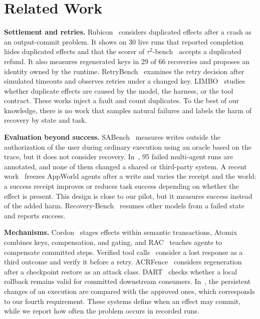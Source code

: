 \documentclass[conference]{IEEEtran}
\begin{document}
\section{Related Work}\label{sec:related}

\textbf{Settlement and retries.} Rubicon~\cite{mohammadi2026rubicon} considers duplicated effects after a crash as an output-commit problem. It shows on 30 live runs that reported completion hides duplicated effects and that the scorer of $\tau^2$-bench~\cite{barres2026tau2} accepts a duplicated refund. It also measures regenerated keys in 29 of 66 recoveries and proposes an identity owned by the runtime. RetryBench~\cite{liu2026retrybench} examines the retry decision after simulated timeouts and observes retries under a changed key. LIMBO~\cite{li2026exactlyonce} studies whether duplicate effects are caused by the model, the harness, or the tool contract. These works inject a fault and count duplicates. To the best of our knowledge, there is no work that samples natural failures and labels the harm of recovery by state and task.

\textbf{Evaluation beyond success.} SABench~\cite{huang2026sabench} measures writes outside the authorization of the user during ordinary execution using an oracle based on the trace, but it does not consider recovery. In~\cite{wang2026dependable}, 95 failed multi-agent runs are annotated, and none of them changed a shared or third-party system. A recent work~\cite{pakhomov2026cleaning} freezes AppWorld agents after a write and varies the receipt and the world: a success receipt improves or reduces task success depending on whether the effect is present. This design is close to our pilot, but it measures success instead of the added harm. Recovery-Bench~\cite{tan2025recoverybench} resumes other models from a failed state and reports success.

\textbf{Mechanisms.} Cordon~\cite{chen2026cordon} stages effects within semantic transactions, Atomix~\cite{mohammadi2026atomix} combines keys, compensation, and gating, and RAC~\cite{perera2026rac} teaches agents to compensate committed steps. Verified tool calls~\cite{mansoor2026verified} consider a lost response as a third outcome and verify it before a retry. ACRFence~\cite{zheng2026acrfence} considers regeneration after a checkpoint restore as an attack class. DART~\cite{yang2026dart} checks whether a local rollback remains valid for committed downstream consumers. In~\cite{zhang2026approvedactionsruntimevalidation}, the persistent changes of an execution are compared with the approved ones, which corresponds to our fourth requirement. These systems define when an effect may commit, while we report how often the problem occurs in recorded runs.
\end{document}
